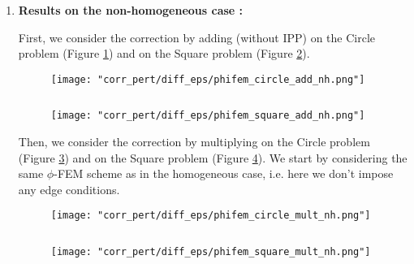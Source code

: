 \begin{enumerate}[label=\textbullet]
	\item \textbf{Results on the non-homogeneous case :}
	
	First, we consider the correction by adding (without IPP) on the Circle problem (Figure \ref{corr_pert_phifem_circle_add_nh}) and on the Square problem (Figure \ref{corr_pert_phifem_square_add_nh}).
	
	\begin{minipage}{0.48\linewidth}
		\begin{figure}[H]
			\centering
			\texttt{[image: "corr\_pert/diff\_eps/phifem\_circle\_add\_nh.png"]}
			\label{corr_pert_phifem_circle_add_nh}
		\end{figure} 
	\end{minipage} $\qquad$
	\begin{minipage}{0.48\linewidth}
		\begin{figure}[H]
			\centering
			\texttt{[image: "corr\_pert/diff\_eps/phifem\_square\_add\_nh.png"]}
			\label{corr_pert_phifem_square_add_nh}
		\end{figure} 
	\end{minipage}
	
	Then, we consider the correction by multiplying on the Circle problem (Figure \ref{corr_pert_phifem_circle_mult_nh}) and on the Square problem (Figure \ref{corr_pert_phifem_square_mult_nh}). We start by considering the same $\phi$-FEM scheme as in the homogeneous case, i.e. here we don't impose any edge conditions.
	
	\begin{minipage}{0.48\linewidth}
		\begin{figure}[H]
			\centering
			\texttt{[image: "corr\_pert/diff\_eps/phifem\_circle\_mult\_nh.png"]}
			\label{corr_pert_phifem_circle_mult_nh}
		\end{figure} 
	\end{minipage} $\qquad$
	\begin{minipage}{0.48\linewidth}
		\begin{figure}[H]
			\centering
			\texttt{[image: "corr\_pert/diff\_eps/phifem\_square\_mult\_nh.png"]}
			\label{corr_pert_phifem_square_mult_nh}
		\end{figure} 
	\end{minipage}
	

\end{enumerate}
